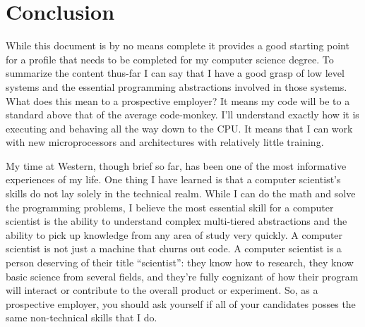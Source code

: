 \chapter{Conclusion}\label{chap:conclusion}
While this document is by no means complete it provides a good starting point for a profile that needs to be completed for my computer science degree. To summarize the content thus-far I can say that I have a good grasp of low level systems and the essential programming abstractions involved in those systems. What does this mean to a prospective employer? It means my code will be to a standard above that of the average code-monkey. I'll understand exactly how it is executing and behaving all the way down to the CPU. It means that I can work with new microprocessors and architectures with relatively little training.

My time at Western, though brief so far, has been one of the most informative experiences of my life. One thing I have learned is that a computer scientist's skills do not lay solely in the technical realm. While I can do the math and solve the programming problems, I believe the most essential skill for a computer scientist is the ability to understand complex multi-tiered abstractions and the ability to pick up knowledge from any area of study very quickly. A computer scientist is not just a machine that churns out code. A computer scientist is a person deserving of their title ``scientist'': they know how to research, they know basic science from several fields, and they're fully cognizant of how their program will interact or contribute to the overall product or experiment. So, as a prospective employer, you should ask yourself if all of your candidates posses the same non-technical skills that I do.
